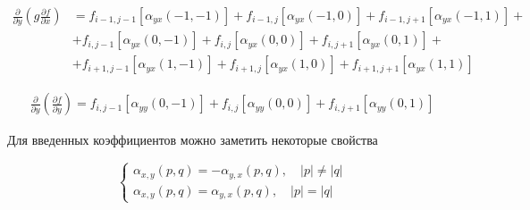 \begin{equation*}
    \begin{split}
        \frac
            {\partial}
            {\partial y}
        \left(
            g
            \frac
                {\partial f}
                {\partial x}
        \right)
        &
        =
        f_{i-1, j-1}
        \left[
            \alpha_{yx} \left(-1, -1\right)
        \right]
        +
        f_{i-1,j}
        \left[
            \alpha_{yx} \left(-1, 0\right)
        \right]
        +
        f_{i-1, j+1}
        \left[
            \alpha_{yx} \left(-1, 1\right)
        \right]
        +
        \\
        &
        +
        f_{i, j-1}
        \left[
            \alpha_{yx} \left(0, -1\right)
        \right]
        +
        f_{i, j}
        \left[
            \alpha_{yx} \left(0, 0\right)
        \right]
        +
        f_{i, j+1}
        \left[
            \alpha_{yx} \left(0, 1\right)
        \right]
        +
        \\
        &
        +
        f_{i+1, j-1}
        \left[
            \alpha_{yx} \left(1, -1\right)
        \right]
        +
        f_{i+1, j}
        \left[
            \alpha_{yx} \left(1, 0\right)
        \right]
        +
        f_{i+1, j+1}
        \left[
            \alpha_{yx} \left(1, 1\right)
        \right]
    \end{split}
\end{equation*}

\begin{equation*}
    \begin{split}
        \frac
            {\partial}
            {\partial y}
        \left(
            \frac
                {\partial f}
                {\partial y}
        \right)
        =
        f_{i, j-1}
        \left[
            \alpha_{yy} \left(0, -1\right)
        \right]
        +
        f_{i, j}
        \left[
            \alpha_{yy} \left(0, 0\right)
        \right]
        +
        f_{i, j+1}
        \left[
            \alpha_{yy} \left(0, 1\right)
        \right]
    \end{split}
\end{equation*}

Для введенных коэффициентов можно заметить некоторые свойства

\begin{equation*}
    \begin{cases}
        \alpha_{x,y} \left(p, q\right)
        =
        -
        \alpha_{y,x} \left(p,q\right),
            \quad
            \left|p\right|
            \ne
            \left|q\right|
        \\
        \alpha_{x,y} \left(p, q\right)
        =
        \alpha_{y,x} \left(p,q\right),
            \quad
            \left|p\right|
            =
            \left|q\right|
    \end{cases}
\end{equation*}

